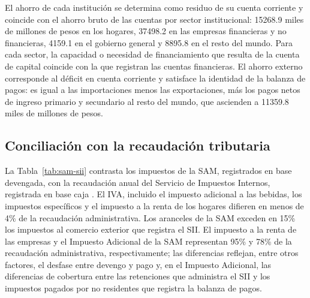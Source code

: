 \documentclass[11pt]{article}
\begin{document}
El ahorro de cada institución se determina como residuo de su cuenta corriente y coincide con el ahorro bruto de las cuentas por sector institucional: 15268.9 miles de millones de pesos en los hogares, 37498.2 en las empresas financieras y no financieras, 4159.1 en el gobierno general y 8895.8 en el resto del mundo. Para cada sector, la capacidad o necesidad de financiamiento que resulta de la cuenta de capital coincide con la que registran las cuentas financieras. El ahorro externo corresponde al déficit en cuenta corriente y satisface la identidad de la balanza de pagos: es igual a las importaciones menos las exportaciones, más los pagos netos de ingreso primario y secundario al resto del mundo, que ascienden a 11359.8 miles de millones de pesos.

\subsection{Conciliación con la recaudación tributaria}

La Tabla~\ref{tab:sam-sii} contrasta los impuestos de la SAM, registrados en base devengada, con la recaudación anual del Servicio de Impuestos Internos, registrada en base caja \cite{sii_ingresos_2025}. El IVA, incluido el impuesto adicional a las bebidas, los impuestos específicos y el impuesto a la renta de los hogares difieren en menos de 4\% de la recaudación administrativa. Los aranceles de la SAM exceden en 15\% los impuestos al comercio exterior que registra el SII. El impuesto a la renta de las empresas y el Impuesto Adicional de la SAM representan 95\% y 78\% de la recaudación administrativa, respectivamente; las diferencias reflejan, entre otros factores, el desfase entre devengo y pago y, en el Impuesto Adicional, las diferencias de cobertura entre las retenciones que administra el SII y los impuestos pagados por no residentes que registra la balanza de pagos.
\end{document}
